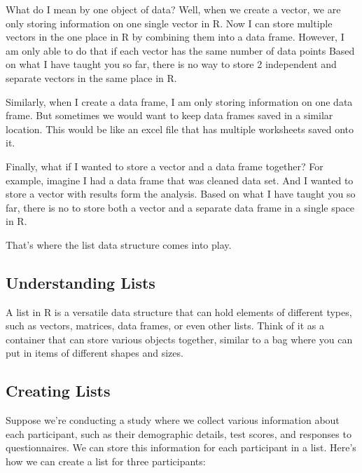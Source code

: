 \documentclass[
]{book}
\begin{document}
What do I mean by one object of data? Well, when we create a vector, we are only storing information on one single vector in R. Now I can store multiple vectors in the one place in R by combining them into a data frame. However, I am only able to do that if each vector has the same number of data points Based on what I have taught you so far, there is no way to store 2 independent and separate vectors in the same place in R.

Similarly, when I create a data frame, I am only storing information on one data frame. But sometimes we would want to keep data frames saved in a similar location. This would be like an excel file that has multiple worksheets saved onto it.

Finally, what if I wanted to store a vector and a data frame together? For example, imagine I had a data frame that was cleaned data set. And I wanted to store a vector with results form the analysis. Based on what I have taught you so far, there is no to store both a vector and a separate data frame in a single space in R.

That's where the list data structure comes into play.

\hypertarget{understanding-lists}{%
\subsection{Understanding Lists}\label{understanding-lists}}

A list in R is a versatile data structure that can hold elements of different types, such as vectors, matrices, data frames, or even other lists. Think of it as a container that can store various objects together, similar to a bag where you can put in items of different shapes and sizes.

\hypertarget{creating-lists}{%
\subsection{Creating Lists}\label{creating-lists}}

Suppose we're conducting a study where we collect various information about each participant, such as their demographic details, test scores, and responses to questionnaires. We can store this information for each participant in a list. Here's how we can create a list for three participants:
\end{document}

